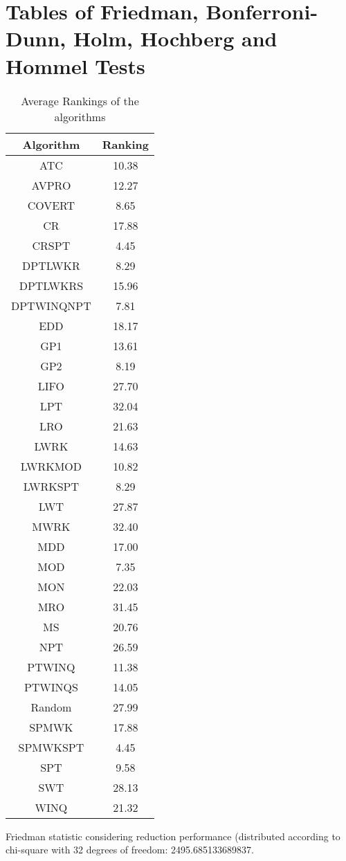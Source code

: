 \documentclass[a3paper,10pt]{article}
\author{}
\date{\today}
\begin{document}
\oddsidemargin 0in \topmargin 0in\maketitle
\section{Tables of Friedman, Bonferroni-Dunn, Holm, Hochberg and Hommel Tests}
\begin{table}[!htp]
\centering
\caption{Average Rankings of the algorithms
}\begin{tabular}{c|c}
Algorithm&Ranking\\
\hline
ATC&10.38\\
AVPRO&12.27\\
COVERT&8.65\\
CR&17.88\\
CRSPT&4.45\\
DPTLWKR&8.29\\
DPTLWKRS&15.96\\
DPTWINQNPT&7.81\\
EDD&18.17\\
GP1&13.61\\
GP2&8.19\\
LIFO&27.70\\
LPT&32.04\\
LRO&21.63\\
LWRK&14.63\\
LWRKMOD&10.82\\
LWRKSPT&8.29\\
LWT&27.87\\
MWRK&32.40\\
MDD&17.00\\
MOD&7.35\\
MON&22.03\\
MRO&31.45\\
MS&20.76\\
NPT&26.59\\
PTWINQ&11.38\\
PTWINQS&14.05\\
Random&27.99\\
SPMWK&17.88\\
SPMWKSPT&4.45\\
SPT&9.58\\
SWT&28.13\\
WINQ&21.32\\
\end{tabular}
\end{table}


Friedman statistic considering reduction performance (distributed according to chi-square with 32 degrees of freedom: 2495.685133689837.
\end{document}
